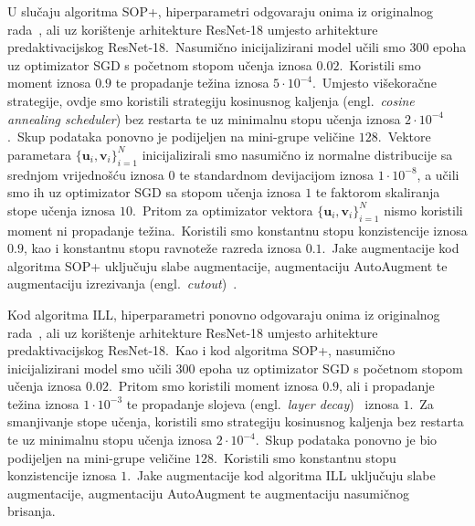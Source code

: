 \documentclass[diplomskirad]{fer}
\begin{document}
U slučaju algoritma SOP+, hiperparametri odgovaraju onima iz originalnog rada~\cite{liu2022robust}, ali uz korištenje arhitekture ResNet-18 umjesto arhitekture predaktivacijskog ResNet-18.\ Nasumično inicijalizirani model učili smo $300$ epoha uz optimizator SGD s početnom stopom učenja iznosa $0.02$.\ 
Koristili smo moment iznosa $0.9$ te propadanje težina iznosa $5 \cdot 10^{-4}$.\ Umjesto višekoračne strategije, ovdje smo koristili strategiju kosinusnog kaljenja (engl.\ \textit{cosine annealing scheduler}) bez restarta te uz minimalnu stopu učenja iznosa $2 \cdot 10^{-4}$.\ Skup podataka ponovno je podijeljen na mini-grupe veličine $128$.\ 
Vektore parametara $\{\bm{u}_i, \bm{v}_i\}_{i=1}^N$ inicijalizirali smo nasumično iz normalne distribucije sa srednjom vrijednošću iznosa $0$ te standardnom devijacijom iznosa $1 \cdot 10^{-8}$, a učili smo ih uz optimizator SGD sa stopom učenja iznosa $1$ te faktorom skaliranja stope učenja iznosa $10$.\ 
Pritom za optimizator vektora $\{\bm{u}_i, \bm{v}_i\}_{i=1}^N$ nismo koristili moment ni propadanje težina.\
Koristili smo konstantnu stopu konzistencije iznosa $0.9$, kao i konstantnu stopu ravnoteže razreda iznosa $0.1$.\ 
Jake augmentacije kod algoritma SOP+ uključuju slabe augmentacije, augmentaciju AutoAugment te augmentaciju izrezivanja (engl.\ \textit{cutout})~\cite{devries2017improved}.\ 

Kod algoritma ILL, hiperparametri ponovno odgovaraju onima iz originalnog rada~\cite{chen2024imprecise}, ali uz korištenje arhitekture ResNet-18 umjesto arhitekture predaktivacijskog ResNet-18.\ 
Kao i kod algoritma SOP+, nasumično inicijalizirani model smo učili 300 epoha uz optimizator SGD s početnom stopom učenja iznosa $0.02$.\ 
Pritom smo koristili moment iznosa $0.9$, ali i propadanje težina iznosa $1 \cdot 10^{-3}$ te propadanje slojeva (engl.\ \textit{layer decay})~\cite{ishii2017layer} iznosa $1$.\ 
Za smanjivanje stope učenja, koristili smo strategiju kosinusnog kaljenja bez restarta te uz minimalnu stopu učenja iznosa $2 \cdot 10^{-4}$.\
Skup podataka ponovno je bio podijeljen na mini-grupe veličine $128$.\ Koristili smo konstantnu stopu konzistencije iznosa $1$.\
Jake augmentacije kod algoritma ILL uključuju slabe augmentacije, augmentaciju AutoAugment te augmentaciju nasumičnog brisanja.\
\end{document}
